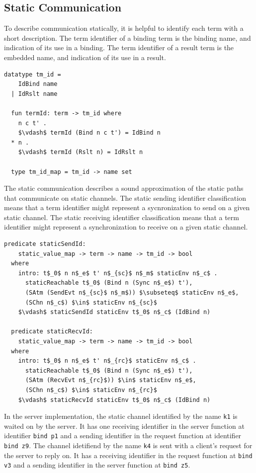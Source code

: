 \documentclass[letterpaper, 11pt]{report}
\begin{document}
\subsection{Static Communication}
To describe communication statically, it is helpful to identify each term with a short description.
The term identifier of a binding term is the binding name, and indication of its use in a binding.
The term identifier of a result term is the embedded name, and indication of its use in a result.

\begin{lstlisting}[language=logic, mathescape]
  datatype tm_id =
    IdBind name
  | IdRslt name 

  fun termId: term -> tm_id where
    n c t' . 
    $\vdash$ termId (Bind n c t') = IdBind n
  * n . 
    $\vdash$ termId (Rslt n) = IdRslt n

  type tm_id_map = tm_id -> name set
\end{lstlisting}

The static communication describes a sound approximation of
the static paths that communicate on static channels.
The static sending identifier classification means that a term identifier might represent a
sycnronization to send on a given static channel.
The static receiving identifier classification means that a term identifier might represent a
synchronization to receive on a given static channel. 

\begin{lstlisting}[language=logic, mathescape]
  predicate staticSendId:
    static_value_map -> term -> name -> tm_id -> bool 
  where
    intro: t$_0$ n n$_e$ t' n$_{sc}$ n$_m$ staticEnv n$_c$ .
      staticReachable t$_0$ (Bind n (Sync n$_e$) t'),
      (SAtm (SendEvt n$_{sc}$ n$_m$)) $\subseteq$ staticEnv n$_e$, 
      (SChn n$_c$) $\in$ staticEnv n$_{sc}$
    $\vdash$ staticSendId staticEnv t$_0$ n$_c$ (IdBind n)

  predicate staticRecvId:
    static_value_map -> term -> name -> tm_id -> bool
  where
    intro: t$_0$ n n$_e$ t' n$_{rc}$ staticEnv n$_c$ .
      staticReachable t$_0$ (Bind n (Sync n$_e$) t'),
      (SAtm (RecvEvt n$_{rc}$)) $\in$ staticEnv n$_e$, 
      (SChn n$_c$) $\in$ staticEnv n$_{rc}$ 
    $\vdash$ staticRecvId staticEnv t$_0$ n$_c$ (IdBind n)
\end{lstlisting}


In the server implementation,
the static channel identified by the name \lstinline{k1} is waited on
by the server. It has one receiving identifier in the server function
at identifier \lstinline[language=sugar_lang]{bind p1} and a sending identifier 
in the request function at identifier \lstinline[language=sugar_lang]{bind z9}.
The channel idetifiend by the name \lstinline{k4} is sent with a client's request for
the server to reply on. It has a receiving identifier in the request function at
\lstinline[language=sugar_lang]{bind v3} and a sending identifier in the server function at
\lstinline[language=sugar_lang]{bind z5}.
\end{document}
